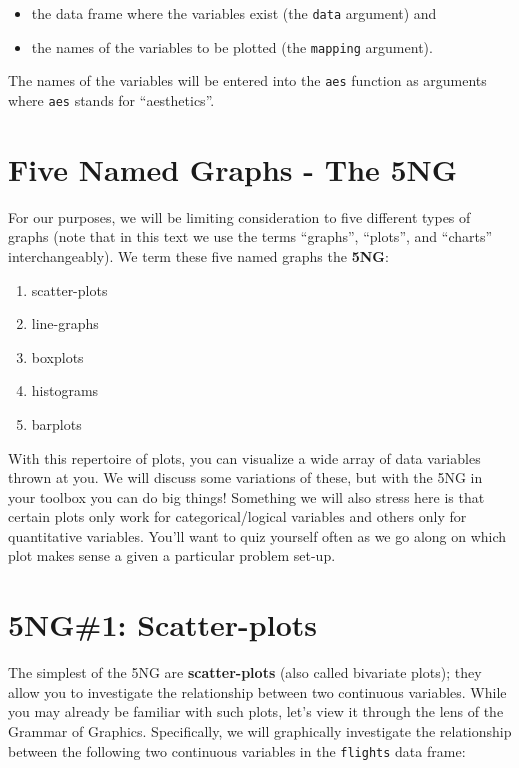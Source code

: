 \documentclass[]{tufte-book}
\providecommand{\tightlist}{%
  \setlength{\itemsep}{0pt}\setlength{\parskip}{0pt}}
\begin{document}
\begin{itemize}
\tightlist
\item
  the data frame where the variables exist (the \texttt{data} argument)
  and
\item
  the names of the variables to be plotted (the \texttt{mapping}
  argument).
\end{itemize}

The names of the variables will be entered into the \texttt{aes}
function as arguments where \texttt{aes} stands for ``aesthetics''.

\section{Five Named Graphs - The 5NG}\label{five-named-graphs---the-5ng}

For our purposes, we will be limiting consideration to five different
types of graphs (note that in this text we use the terms ``graphs'',
``plots'', and ``charts'' interchangeably). We term these five named
graphs the \textbf{5NG}:

\begin{enumerate}
\def\labelenumi{\arabic{enumi}.}
\tightlist
\item
  scatter-plots
\item
  line-graphs
\item
  boxplots
\item
  histograms
\item
  barplots
\end{enumerate}

With this repertoire of plots, you can visualize a wide array of data
variables thrown at you. We will discuss some variations of these, but
with the 5NG in your toolbox you can do big things! Something we will
also stress here is that certain plots only work for categorical/logical
variables and others only for quantitative variables. You'll want to
quiz yourself often as we go along on which plot makes sense a given a
particular problem set-up.

\section{5NG\#1: Scatter-plots}\label{scatterplots}

The simplest of the 5NG are \textbf{scatter-plots} (also called
bivariate plots); they allow you to investigate the relationship between
two continuous variables. While you may already be familiar with such
plots, let's view it through the lens of the Grammar of Graphics.
Specifically, we will graphically investigate the relationship between
the following two continuous variables in the \texttt{flights} data
frame:
\end{document}
